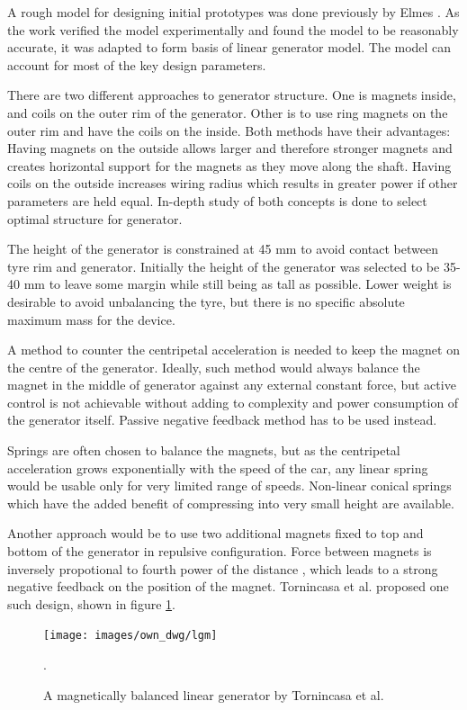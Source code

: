 A rough model for designing initial prototypes was done previously by Elmes \cite{Elmes2005}. As the work verified the model experimentally and found the model to be reasonably accurate, it was adapted to form basis of linear generator model. The model can account for most of the key design parameters. 

There are two different approaches to generator structure. One is magnets inside, and coils on the outer rim of the generator. Other is to use ring magnets on the outer rim and have the coils on the inside. Both methods have their advantages: Having magnets on the outside allows larger and therefore stronger magnets and creates horizontal support for the magnets as they move along the shaft. Having coils on the outside increases wiring radius which results in greater power if other parameters are held equal. In-depth study of both concepts is done to select optimal structure for generator. 

The height of the generator is constrained at 45 mm to avoid contact between tyre rim and generator. Initially the height of the generator was selected to be 35-40 mm to leave some margin while still being as tall as possible. Lower weight is desirable to avoid unbalancing the tyre, but there is no specific absolute maximum mass for the device. 

A method to counter the centripetal acceleration is needed to keep the magnet on the centre of the generator. Ideally, such method would always balance the magnet in the middle of generator against any external constant force, but active control is not achievable without adding to complexity and power consumption of the generator itself. Passive negative feedback method has to be used instead. 

Springs are often chosen to balance the magnets, but as the centripetal acceleration grows exponentially with the speed of the car, any linear spring would be usable only for very limited range of speeds. Non-linear conical springs which have the added benefit of compressing into very small height are available.

Another approach would be to use two additional magnets fixed to top and bottom of the generator in repulsive configuration. Force between magnets is inversely propotional to fourth power of the distance \cite{Amrani2015}, which leads to a strong negative feedback on the position of the magnet. Tornincasa et al. \cite{Tornincasa2012} proposed one such design, shown in figure \ref{lgm}.

\begin{figure}[htb]
\begin{center}
\texttt{[image: images/own\_dwg/lgm]}
\end{center}
\caption{A magnetically balanced linear generator by Tornincasa et al. \cite{Tornincasa2012}}.
\label{lgm}
\end{figure}

